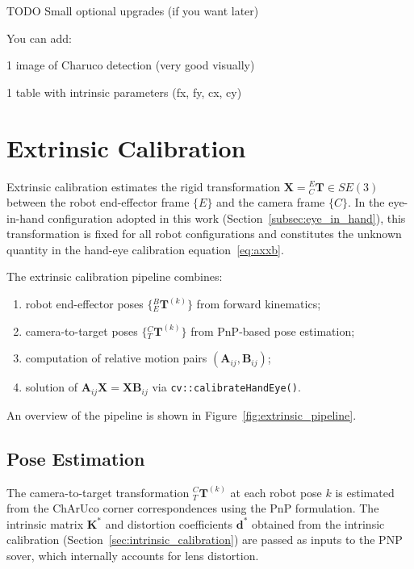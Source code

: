 TODO
 Small optional upgrades (if you want later)

You can add:

1 image of Charuco detection (very good visually)

1 table with intrinsic parameters (fx, fy, cx, cy)



\section{Extrinsic Calibration}
\label{sec:extrinsic_calibration}

Extrinsic calibration estimates the rigid transformation $\mathbf{X} =
{}^E_C\mathbf{T} \in SE(3)$ between the robot end-effector frame $\{E\}$ and
the camera frame $\{C\}$. In the eye-in-hand configuration adopted in this
work (Section~\ref{subsec:eye_in_hand}), this transformation is fixed for
all robot configurations and constitutes the unknown quantity in the
hand-eye calibration equation~\eqref{eq:axxb}.

The extrinsic calibration pipeline combines:
\begin{enumerate}
    \item robot end-effector poses $\{{}^B_E\mathbf{T}^{(k)}\}$ from forward
    kinematics;
    \item camera-to-target poses $\{{}^C_T\mathbf{T}^{(k)}\}$ from
    PnP-based pose estimation;
    \item computation of relative motion pairs $(\mathbf{A}_{ij},
    \mathbf{B}_{ij})$;
    \item solution of $\mathbf{A}_{ij}\mathbf{X} = \mathbf{X}\mathbf{B}_{ij}$
    via \texttt{cv::calibrateHandEye()}.
\end{enumerate}

\noindent An overview of the pipeline is shown in
Figure~\ref{fig:extrinsic_pipeline}.

\subsection{Pose Estimation}
\label{subsec:extr_pose_est}

The camera-to-target transformation ${}^C_T\mathbf{T}^{(k)}$ at each robot
pose $k$ is estimated from the ChArUco corner correspondences using the
PnP formulation. The
intrinsic matrix $\mathbf{K}^*$ and distortion coefficients $\mathbf{d}^*$
obtained from the intrinsic calibration (Section~\ref{sec:intrinsic_calibration})
are passed as inputs to the PNP sover, which internally accounts for lens distortion.

